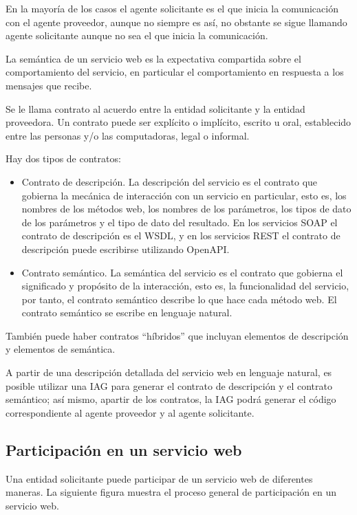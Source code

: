 En la mayoría de los casos el agente solicitante es el que inicia la comunicación con el agente proveedor, aunque no siempre es así, no obstante se sigue llamando agente solicitante aunque no sea el que inicia la comunicación.

La semántica de un servicio web es la expectativa compartida sobre el comportamiento del servicio, en particular el comportamiento en respuesta a los mensajes que recibe.

Se le llama contrato al acuerdo entre la entidad solicitante y la entidad proveedora. Un contrato puede ser explícito o implícito, escrito u oral, establecido entre las personas y/o las computadoras, legal o informal.

Hay dos tipos de contratos:

\begin{itemize}
\item Contrato de descripción. La descripción del servicio es el contrato que gobierna la mecánica de interacción con un servicio en particular, esto es, los nombres de los métodos web, los nombres de los parámetros, los tipos de dato de los parámetros y el tipo de dato del resultado. En los servicios SOAP el contrato de descripción es el WSDL, y en los servicios REST el contrato de descripción puede escribirse utilizando OpenAPI.
\item Contrato semántico. La semántica del servicio es el contrato que gobierna el significado y propósito de la interacción, esto es, la funcionalidad del servicio, por tanto, el contrato semántico describe lo que hace cada método web. El contrato semántico se escribe en lenguaje natural.
\end{itemize}

También puede haber contratos “híbridos” que incluyan elementos de descripción y elementos de semántica.

A partir de una descripción detallada del servicio web en lenguaje natural, es posible utilizar una IAG para generar el contrato de descripción y el contrato semántico; así mismo, apartir de los contratos, la IAG podrá generar el código correspondiente al agente proveedor y al agente solicitante.

\subsection{Participación en un servicio web}

Una entidad solicitante puede participar de un servicio web de diferentes maneras. La siguiente figura muestra el proceso general de participación en un servicio web.


